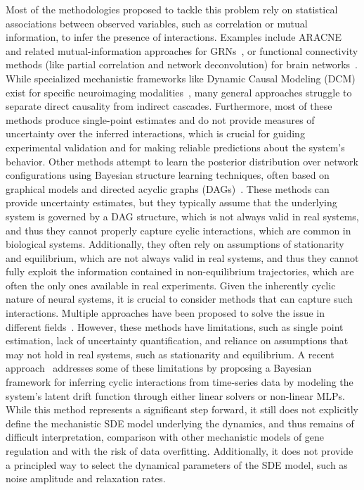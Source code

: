 \documentclass[10pt, aps, rmp,  twocolumn, superscriptaddress, floatfix, showkeys]{revtex4-2}
\begin{document}
Most of the methodologies proposed to tackle this problem rely on statistical associations between observed variables, such as correlation or mutual information, to infer the presence of interactions. Examples include ARACNE and related mutual-information approaches for GRNs~\cite{margolin2006aracne,marbach2012wisdom}, or functional connectivity methods (like partial correlation and network deconvolution) for brain networks~\cite{smith2011network}. While specialized mechanistic frameworks like Dynamic Causal Modeling (DCM) exist for specific neuroimaging modalities~\cite{friston2003dynamic}, many general approaches struggle to separate direct causality from indirect cascades. Furthermore, most of these methods produce single-point estimates and do not provide measures of uncertainty over the inferred interactions, which is crucial for guiding experimental validation and for making reliable predictions about the system's behavior.
Other methods attempt to learn the posterior distribution over network configurations using Bayesian structure learning techniques, often based on graphical models and directed acyclic graphs (DAGs)~\cite{glymour2019review}. These methods can provide uncertainty estimates, but they typically assume that the underlying system is governed by a DAG structure, which is not always valid in real systems, and thus they cannot properly capture cyclic interactions, which are common in biological systems. Additionally, they often rely on assumptions of stationarity and equilibrium, which are not always valid in real systems, and thus they cannot fully exploit the information contained in non-equilibrium trajectories, which are often the only ones available in real experiments.
Given the inherently cyclic nature of neural systems, it is crucial to consider methods that can capture such interactions. Multiple approaches have been proposed to solve the issue in different fields~\cite{huang2020causal,runge2019detecting}. However, these methods have limitations, such as single point estimation, lack of uncertainty quantification, and reliance on assumptions that may not hold in real systems, such as stationarity and equilibrium.
A recent approach~\cite{atanackovic2023dyngfn} addresses some of these limitations by proposing a Bayesian framework for inferring cyclic interactions from time-series data by modeling the system's latent drift function through either linear solvers or non-linear MLPs. While this method represents a significant step forward, it still does not explicitly define the mechanistic SDE model underlying the dynamics, and thus remains of difficult interpretation, comparison with other mechanistic models of gene regulation and with the risk of data overfitting. Additionally, it does not provide a principled way to select the dynamical parameters of the SDE model, such as noise amplitude and relaxation rates.
\end{document}
